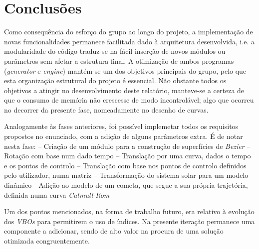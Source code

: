 \documentclass[relatorio.tex]{subfiles}
\begin{document}
\section{Conclusões}
Como consequência do esforço do grupo ao longo do projeto, a implementação de novas funcionalidades
permanece facilitada dado à arquitetura desenvolvida, i.e. a modularidade do código 
traduz-se na fácil inserção de novos módulos ou parâmetros sem afetar a estrutura final.
A otimização de ambos programas (\textit{generator} e \textit{engine}) mantém-se um
dos objetivos principais do grupo, pelo que esta organização estrutural do projeto é essencial.
Não obstante todos os objetivos a atingir no desenvolvimento deste relatório, manteve-se 
a certeza de que o consumo de memória não crescesse de modo incontrolável; algo que 
ocorreu no decorrer da presente fase, nomeadamente no desenho de curvas.

Analogamente às fases anteriores, foi possível implemetar todos os requisitos propostos 
no enunciado, com a adição de alguns parâmetros extra.
É de notar nesta fase:
– Criação de um módulo para a construção de superfícies de \textit{Bezier}
– Rotação com base num dado tempo
– Translação por uma curva, dados o tempo e os pontos de controlo
– Translação com base nos pontos de controlo definidos pelo utilizador, numa matriz
– Transformação do sistema solar para um modelo dinâmico
- Adição ao modelo de um cometa, que segue a sua própria trajetória, definida numa curva \textit{Catmull-Rom}

Um dos pontos mencionados, na forma de trabalho futuro, era relativo à evolução dos \textit{VBOs}
para permitirem o uso de índices. Na presente iteração permanece uma componente a adicionar, sendo
de alto valor na procura de uma solução otimizada congruentemente.
\end{document}
